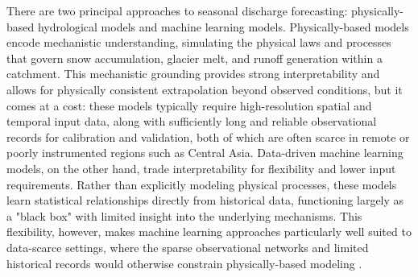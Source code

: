 \documentclass[review,12pt,authoryear]{elsarticle}
\begin{document}
There are two principal approaches to seasonal discharge forecasting: physically-based hydrological models and machine learning models. Physically-based models encode mechanistic understanding, simulating the physical laws and processes that govern snow accumulation, glacier melt, and runoff generation within a catchment. This mechanistic grounding provides strong interpretability and allows for physically consistent extrapolation beyond observed conditions, but it comes at a cost: these models typically require high-resolution spatial and temporal input data, along with sufficiently long and reliable observational records for calibration and validation, both of which are often scarce in remote or poorly instrumented regions such as Central Asia. Data-driven machine learning models, on the other hand, trade interpretability for flexibility and lower input requirements. Rather than explicitly modeling physical processes, these models learn statistical relationships directly from historical data, functioning largely as a "black box" with limited insight into the underlying mechanisms. This flexibility, however, makes machine learning approaches particularly well suited to data-scarce settings, where the sparse observational networks and limited historical records would otherwise constrain physically-based modeling \citep{jin2024, liang2023, sayed2023, mohammadi2021}.
\end{document}
